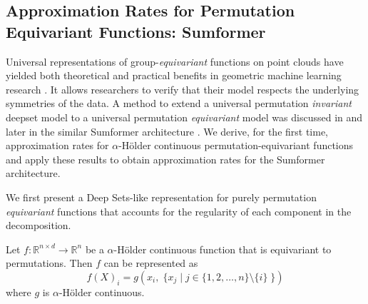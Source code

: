 \documentclass[twoside,11pt]{article}
\newcommand{\RR}{\mathbb{R}}
\newcommand{\ah}{$\alpha$-H\"older }
\newcommand{\nd}[1]{{\color{red}{\bf[Nadav:} 
#1{\bf]}}}
\begin{document}












\subsection{Approximation Rates for Permutation Equivariant Functions: Sumformer}\label{subsec:equivariant}
Universal representations of group-\emph{equivariant} functions on point clouds have yielded both theoretical and practical benefits in geometric machine learning research \cite{villar2021scalars}. It allows researchers to verify that their model respects the underlying symmetries of the data. A method to extend a universal permutation \emph{invariant} deepset model to a universal permutation \emph{equivariant} model was discussed in \cite{segoluniversal} and later in the similar Sumformer architecture \cite{Sumformer}. We derive, for the first time, approximation rates for \ah continuous permutation-equivariant functions and apply these results to obtain approximation rates for the Sumformer architecture.

 We first present a Deep Sets-like representation for purely permutation \textit{equivariant} functions that accounts for the regularity of each component in the decomposition. 

\begin{cor}\label{thm:chr-equi-fun}
Let $f: \RR^{n\times d} \to \RR^{n}$ be a \ah continuous function that is equivariant to permutations. Then $f$ can be represented as
$$ f(X)_i = g(x_i,\; \{ x_j \mid j\in \{ 1,2,\ldots,n\} \setminus \{i\} \; \}) $$
where $g$ is \ah continuous. 

\end{cor}
\end{document}
